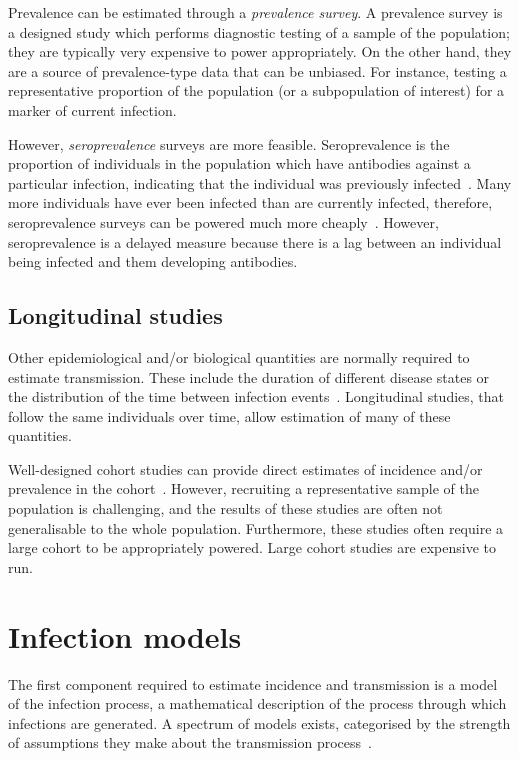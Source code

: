 \documentclass[thesis.tex]{subfiles}
\begin{document}
Prevalence can be estimated through a \emph{prevalence survey}.
A prevalence survey is a designed study which performs diagnostic testing of a sample of the population; they are typically very expensive to power appropriately.
On the other hand, they are a source of prevalence-type data that can be unbiased.
For instance, testing a representative proportion of the population (or a subpopulation of interest) for a marker of current infection.

However, \emph{seroprevalence} surveys are more feasible.
Seroprevalence is the proportion of individuals in the population which have antibodies against a particular infection, indicating that the individual was previously infected~\autocite{cdcSeroprevalence}.
Many more individuals have ever been infected than are currently infected, therefore, seroprevalence surveys can be powered much more cheaply~\autocite{wuSeroprevSimulation}.
However, seroprevalence is a delayed measure because there is a lag between an individual being infected and them developing antibodies.

\subsection{Longitudinal studies}

Other epidemiological and/or biological quantities are normally required to estimate transmission.
These include the duration of different disease states or the distribution of the time between infection events~\autocite{wallingaGI,dankwaStructural}.
Longitudinal studies, that follow the same individuals over time, allow estimation of many of these quantities.

Well-designed cohort studies can provide direct estimates of incidence and/or prevalence in the cohort~\autocite[chapter 7]{lashModern}.
However, recruiting a representative sample of the population is challenging, and the results of these studies are often not generalisable to the whole population.
Furthermore, these studies often require a large cohort to be appropriately powered.
Large cohort studies are expensive to run.

\section{Infection models}

The first component required to estimate incidence and transmission is a model of the infection process, a mathematical description of the process through which infections are generated.
A spectrum of models exists, categorised by the strength of assumptions they make about the transmission process~\autocite{beckerCOVIDmodels}.
\end{document}
